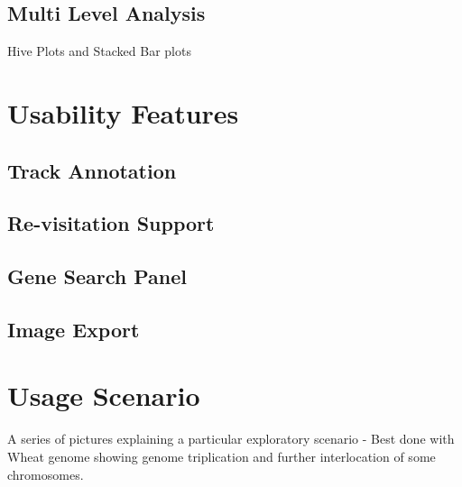 









\subsection{Multi Level Analysis}
Hive Plots and Stacked Bar plots

\section{Usability Features}
\subsection{Track Annotation}
\subsection{Re-visitation Support}
\subsection{Gene Search Panel}
\subsection{Image Export}


\section{Usage Scenario}
A series of pictures explaining a particular exploratory scenario - Best done with Wheat genome showing genome triplication and further interlocation of some chromosomes.